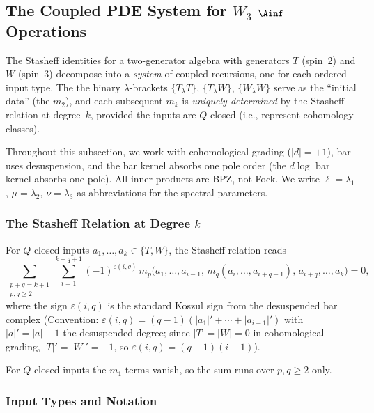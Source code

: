 \subsection{The Coupled PDE System for $W_3$ $\Ainf$ Operations}
\label{subsec:w3-coupled-pde}

\providecommand{\Assoc}{\mathfrak{A}}

The Stasheff identities for a two-generator algebra with generators $T$
(spin~2) and $W$ (spin~3) decompose into a \emph{system} of coupled
recursions, one for each ordered input type. The
the binary $\lambda$-brackets $\{T_\lambda T\}$, $\{T_\lambda W\}$,
$\{W_\lambda W\}$ serve as the ``initial data'' (the $m_2$), and each
subsequent $m_k$ is \emph{uniquely determined} by the Stasheff relation
at degree~$k$, provided the inputs are $Q$-closed
(i.e., represent cohomology classes).

Throughout this subsection, we work with cohomological grading
($|d| = +1$), bar uses desuspension, and the bar kernel absorbs one
pole order (the $d\log$ bar kernel absorbs one pole). All inner products are BPZ, not Fock.
We write $\ell = \lambda_1$, $\mu = \lambda_2$, $\nu = \lambda_3$
as abbreviations for the spectral parameters.

\subsubsection{The Stasheff Relation at Degree $k$}

For $Q$-closed inputs $a_1, \ldots, a_k \in \{T, W\}$, the Stasheff
relation reads
\begin{equation}
\label{eq:w3-stasheff-k}
\sum_{\substack{p+q = k+1 \\ p,q \ge 2}}
\sum_{i=1}^{k-q+1}
(-1)^{\varepsilon(i,q)}\,
m_p\bigl(a_1, \ldots, a_{i-1},\, m_q(a_i, \ldots, a_{i+q-1}),\, a_{i+q}, \ldots, a_k\bigr) = 0,
\end{equation}
where the sign $\varepsilon(i,q)$ is the standard Koszul sign from the
desuspended bar complex (Convention: $\varepsilon(i,q) =
(q-1)(|a_1|' + \cdots + |a_{i-1}|')$ with $|a|' = |a| - 1$ the
desuspended degree; since $|T| = |W| = 0$ in cohomological grading,
$|T|' = |W|' = -1$, so $\varepsilon(i,q) = (q-1)(i-1)$).

For $Q$-closed inputs the $m_1$-terms vanish, so the sum runs over
$p, q \ge 2$ only.

\subsubsection{Input Types and Notation}

